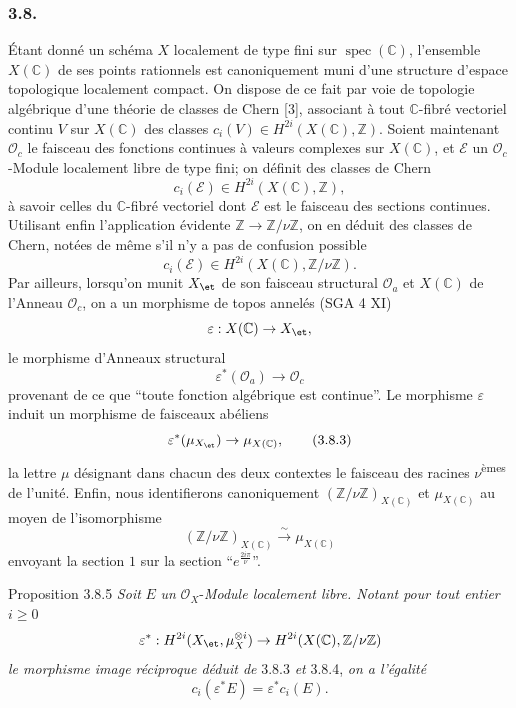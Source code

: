 \subsubsection*{3.8.}
Étant donné un schéma $X$ localement de type fini sur $\operatorname{spec}(\mathbb{C})$, l'ensemble $X(\mathbb{C})$ de ses points rationnels est canoniquement muni d'une structure d'espace topologique localement compact. On dispose de ce fait par voie de topologie algébrique d'une théorie de classes de Chern [3], associant à tout $\mathbb{C}$-fibré vectoriel continu $V$ sur $X(\mathbb{C})$ des classes $c_i(V)\in H^{2i}(X(\mathbb{C}),\mathbb{Z})$. Soient maintenant $\mathcal{O}_c$ le faisceau des fonctions continues à valeurs complexes sur $X(\mathbb{C})$, et $\mathcal{E}$ un $\mathcal{O}_c$-Module localement libre de type fini; on définit des classes de Chern
\[
c_i(\mathcal{E})\in H^{2i}(X(\mathbb{C}),\mathbb{Z}),
\]
à savoir celles du $\mathbb{C}$-fibré vectoriel dont $\mathcal{E}$ est le faisceau des sections continues. Utilisant enfin l'application évidente $\mathbb{Z}\to\mathbb{Z}/\nu\mathbb{Z}$, on en déduit des classes de Chern, notées de même s'il n'y a pas de confusion possible
\[
c_i(\mathcal{E})\in H^{2i}(X(\mathbb{C}),\mathbb{Z}/\nu\mathbb{Z}).
\tag{3.8.1}
\]
Par
ailleurs, lorsqu'on munit $X_{\et}$ de son faisceau structural $\mathcal{O}_a$ et $X(\mathbb{C})$ de l'Anneau $\mathcal{O}_c$, on a un morphisme de topos annelés (SGA 4 XI)
\[
\varepsilon:X(\mathbb{C})\to X_{\et},
\]
le morphisme d'Anneaux structural
\[
\varepsilon^*(\mathcal{O}_a)\to\mathcal{O}_c
\tag{3.8.2}
\]
provenant de ce que ``toute fonction algébrique est continue''. Le morphisme $\varepsilon$ induit un morphisme de faisceaux abéliens
\[
\varepsilon^*(\mu_{X_{\et}})\to \mu_{X(\mathbb{C})},
\tag{3.8.3}
\]
la lettre $\mu$ désignant dans chacun des deux contextes le faisceau des racines $\nu$\textsuperscript{èmes} de l'unité. Enfin, nous identifierons canoniquement $(\mathbb{Z}/\nu\mathbb{Z})_{X(\mathbb{C})}$ et $\mu_{X(\mathbb{C})}$ au moyen de l'isomorphisme
\[
(\mathbb{Z}/\nu\mathbb{Z})_{X(\mathbb{C})}
 \xrightarrow{\sim}\mu_{X(\mathbb{C})}
\tag{3.8.4}
\]
envoyant la section $1$ sur la section ``$e^{\frac{2i\pi}{\nu}}$''.

\begin{statement}{Proposition 3.8.5}
\emph{Soit} $E$ \emph{un} $\mathcal{O}_X$-\emph{Module localement libre. Notant pour tout entier} $i\ge0$
\[
\varepsilon^*:H^{2i}(X_{\et},\mu_X^{\otimes i})
\to H^{2i}(X(\mathbb{C}),\mathbb{Z}/\nu\mathbb{Z})
\]
\emph{le morphisme image réciproque déduit de} 3.8.3 \emph{et} 3.8.4, \emph{on a l'égalité}
\[
c_i(\varepsilon^*E)=\varepsilon^*c_i(E).
\]
\end{statement}

